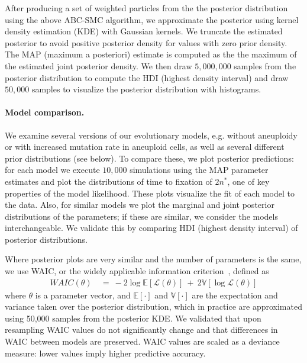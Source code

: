 \documentclass[12pt]{article}
\newcommand{\likelihood}{\mathcal{L}}
\newcommand{\eumt}{\emph{$2n^*$}}
\begin{document}
After producing a set of weighted particles from the the posterior distribution using the above ABC-SMC algorithm, we approximate the posterior using kernel density estimation (KDE) with Gaussian kernels. We truncate the estimated posterior to avoid positive posterior density for values with zero prior density. The MAP (maximum a posteriori) estimate is computed as the the maximum of the estimated joint posterior density. We then draw $5,000,000$ samples from the posterior distribution to compute the HDI (highest density interval) and draw $50,000$ samples to visualize the posterior distribution with histograms.

\paragraph{Model comparison.} 
We examine several versions of our evolutionary models, e.g. without aneuploidy or with increased mutation rate in aneuploid cells, as well as several different prior distributions (see below).
To compare these, we plot posterior predictions: for each model we execute $10,000$ simulations using the MAP parameter estimates and plot the distributions of time to fixation of \eumt, one of key properties of the model likelihood. These plots visualize the fit of each model to the data. 
Also, for similar models we plot the marginal and joint posterior distributions of the parameters; if these are similar, we consider the models interchangeable. We validate this by comparing HDI (highest density interval) of posterior distributions.

Where posterior plots are very similar and the number of parameters is the same, we use WAIC, or the widely applicable information criterion~\citep{gelman2013bayesian}, defined as
\begin{equation} \label{eq:WAIC}
\begin{aligned}
\mathit{WAIC}(\theta) &\ =\ 
-2\log\mathbb{E}[\likelihood(\theta)]\ +\ 2\mathbb{V}[\log\likelihood(\theta)]
\end{aligned}
\end{equation}
where $\theta$ is a parameter vector, and $\mathbb{E}[\cdot]$ and $\mathbb{V}[\cdot]$ are the expectation and variance taken over the posterior distribution, which in practice are approximated using 50,000 samples from the posterior KDE. We validated that upon resampling WAIC values do not significantly change and that differences in WAIC between models are preserved.
WAIC values are scaled as a deviance measure: lower values imply higher predictive accuracy.
 
\end{document}
